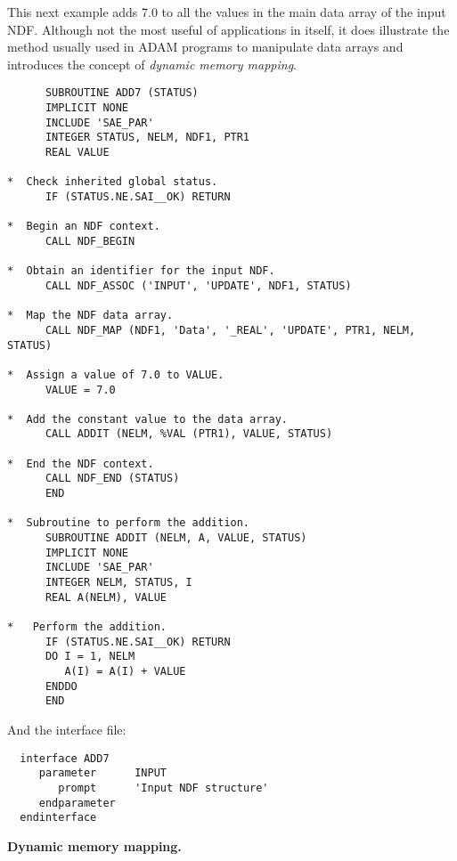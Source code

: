 \documentclass[twoside,11pt]{article}
\renewcommand{\_}{{\tt\char'137}}
\begin{document}
This next example adds 7.0 to all the values in the main data array
of the input NDF.
Although not the most useful of applications in itself, it 
does illustrate the method usually used in ADAM programs to
manipulate data arrays and introduces the 
concept of {\sl dynamic memory mapping}.
\begin{verbatim}
      SUBROUTINE ADD7 (STATUS)                                
      IMPLICIT NONE
      INCLUDE 'SAE_PAR'                                       
      INTEGER STATUS, NELM, NDF1, PTR1
      REAL VALUE
    
*  Check inherited global status.
      IF (STATUS.NE.SAI__OK) RETURN

*  Begin an NDF context.    
      CALL NDF_BEGIN                                          
                                                              
*  Obtain an identifier for the input NDF.
      CALL NDF_ASSOC ('INPUT', 'UPDATE', NDF1, STATUS)           
                                                              
*  Map the NDF data array. 
      CALL NDF_MAP (NDF1, 'Data', '_REAL', 'UPDATE', PTR1, NELM, STATUS)
                                            
*  Assign a value of 7.0 to VALUE.
      VALUE = 7.0

*  Add the constant value to the data array. 
      CALL ADDIT (NELM, %VAL (PTR1), VALUE, STATUS)             

*  End the NDF context.                                       
      CALL NDF_END (STATUS)                                  
      END                                                     
                                                              
*  Subroutine to perform the addition.                        
      SUBROUTINE ADDIT (NELM, A, VALUE, STATUS)                 
      IMPLICIT NONE
      INCLUDE 'SAE_PAR'                                       
      INTEGER NELM, STATUS, I                                   
      REAL A(NELM), VALUE

*   Perform the addition.                     
      IF (STATUS.NE.SAI__OK) RETURN
      DO I = 1, NELM
         A(I) = A(I) + VALUE
      ENDDO
      END                                                     
\end{verbatim}
And the interface file:
\begin{verbatim}
  interface ADD7
     parameter      INPUT
        prompt      'Input NDF structure'
     endparameter
  endinterface
\end{verbatim}
\newpage
{\large\bf Dynamic memory mapping.}
\end{document}
